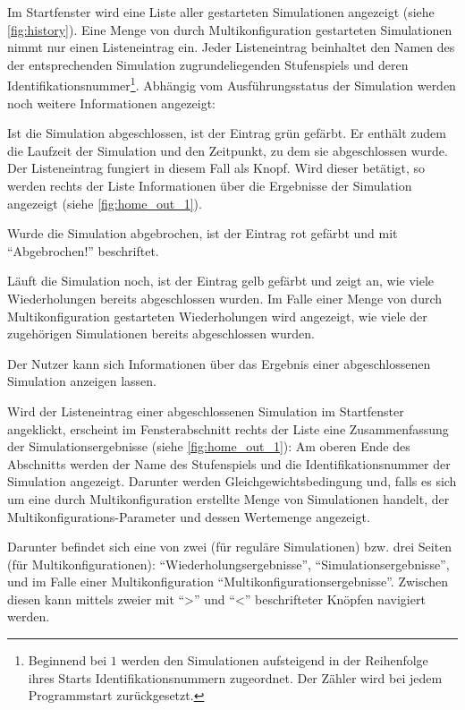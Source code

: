 \documentclass[parskip=full,11pt]{scrartcl}
\begin{document}
Im Startfenster wird eine Liste aller gestarteten Simulationen angezeigt (siehe \cref{fig:history}). Eine Menge von durch Multikonfiguration gestarteten Simulationen nimmt nur einen Listeneintrag ein. Jeder Listeneintrag beinhaltet den Namen des der entsprechenden Simulation zugrundeliegenden Stufenspiels und deren Identifikationsnummer\footnote{Beginnend bei \(1\) werden den Simulationen aufsteigend in der Reihenfolge ihres Starts Identifikationsnummern zugeordnet. Der Zähler wird bei jedem Programmstart zurückgesetzt.}. Abhängig vom Ausführungsstatus der Simulation werden noch weitere Informationen angezeigt:

Ist die Simulation abgeschlossen, ist der Eintrag grün gefärbt. Er enthält zudem die Laufzeit der Simulation und den Zeitpunkt, zu dem sie abgeschlossen wurde. Der Listeneintrag fungiert in diesem Fall als Knopf. Wird dieser betätigt, so werden rechts der Liste Informationen über die Ergebnisse der Simulation angezeigt (siehe \cref{fig:home_out_1}).

Wurde die Simulation abgebrochen, ist der Eintrag rot gefärbt und mit \enquote{Abgebrochen!} beschriftet.

Läuft die Simulation noch, ist der Eintrag gelb gefärbt und zeigt an, wie viele Wiederholungen bereits abgeschlossen wurden. Im Falle einer Menge von durch Multikonfiguration gestarteten Wiederholungen wird angezeigt, wie viele der zugehörigen Simulationen bereits abgeschlossen wurden.

Der \Gls{Nutzer} kann sich Informationen über das Ergebnis einer abgeschlossenen Simulation anzeigen lassen.

Wird der Listeneintrag einer abgeschlossenen Simulation im Startfenster angeklickt, erscheint im Fensterabschnitt rechts der Liste eine Zusammenfassung der Simulationsergebnisse (siehe \cref{fig:home_out_1}): Am oberen Ende des Abschnitts werden der Name des Stufenspiels und die Identifikationsnummer der Simulation angezeigt. Darunter werden Gleichgewichtsbedingung und, falls es sich um eine durch Multikonfiguration erstellte Menge von Simulationen handelt, der Multikonfigurations-Parameter und dessen Wertemenge angezeigt.

Darunter befindet sich eine von zwei (für reguläre Simulationen) bzw. drei Seiten (für Multikonfigurationen): \enquote{Wiederholungsergebnisse}, \enquote{Simulationsergebnisse}, und im Falle einer Multikonfiguration \enquote{Multikonfigurationsergebnisse}. Zwischen diesen kann mittels zweier mit \enquote{>} und \enquote{<} beschrifteter Knöpfen navigiert werden.
\end{document}
